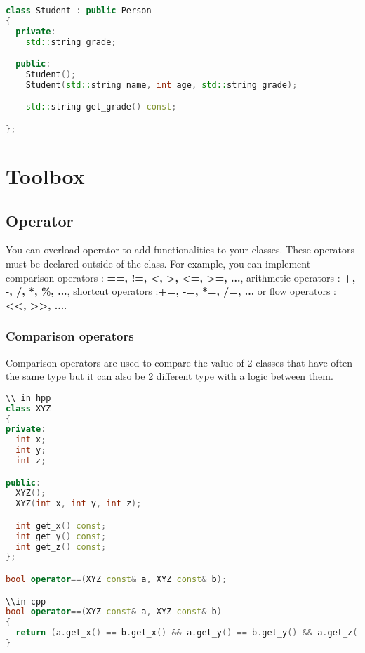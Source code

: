 \documentclass[a4paper, 12pt, titlepage]{scrartcl} %
\begin{document}
\begin{lstlisting}[language=C++]
class Student : public Person
{
  private:
    std::string grade;

  public:
    Student();
    Student(std::string name, int age, std::string grade);

    std::string get_grade() const;

};
\end{lstlisting} \vspace{5mm}

\newpage
\section{Toolbox}

\subsection{Operator}
You can overload operator to add functionalities to your classes. These operators must be declared outside of the class. For example, you can implement comparison operators : \textbf{==, !=, <, >, <=, >=, ...}, arithmetic operators : \textbf{+, -, /, *, \%, ...}, shortcut operators  :\textbf{+=, -=, *=, /=, ...} or flow operators : \textbf{<<, >>, ...}.

\subsubsection{Comparison operators}
Comparison operators are used to compare the value of 2 classes that have often the same type but it can also be 2 different type with a logic between them.

\vspace{5mm}

\begin{lstlisting}[language=C++]
\\ in hpp
class XYZ
{
private:
  int x;
  int y;
  int z;

public:
  XYZ();
  XYZ(int x, int y, int z);

  int get_x() const;
  int get_y() const;
  int get_z() const;
};

bool operator==(XYZ const& a, XYZ const& b);

\\in cpp
bool operator==(XYZ const& a, XYZ const& b)
{
  return (a.get_x() == b.get_x() && a.get_y() == b.get_y() && a.get_z() == b.get_z());
}
\end{lstlisting} \vspace{5mm}
\end{document}
